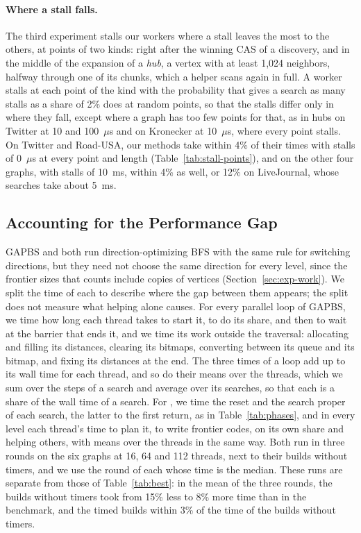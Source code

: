 \paragraph{Where a stall falls.} The third experiment stalls our workers where a stall leaves the most to the others, at points of two kinds: right after the winning CAS of a discovery, and in the middle of the expansion of a \emph{hub}, a vertex with at least 1,024 neighbors, halfway through one of its chunks, which a helper scans again in full. A worker stalls at each point of the kind with the probability that gives a search as many stalls as a share of 2\% does at random points, so that the stalls differ only in where they fall, except where a graph has too few points for that, as in hubs on Twitter at 10 and 100~$\mu$s and on Kronecker at 10~$\mu$s, where every point stalls. On Twitter and Road-USA, our methods take within 4\% of their times with stalls of 0~$\mu$s at every point and length (Table~\ref{tab:stall-points}), and on the other four graphs, with stalls of 10~ms, within 4\% as well, or 12\% on LiveJournal, whose searches take about 5~ms.

\subsection{Accounting for the Performance Gap}
\label{sec:exp-speedup}

GAPBS and \wfdo both run direction-optimizing BFS with the same rule for switching directions, but they need not choose the same direction for every level, since the frontier sizes that \wfdo counts include copies of vertices (Section~\ref{sec:exp-work}). We split the time of each to describe where the gap between them appears; the split does not measure what helping alone causes. For every parallel loop of GAPBS, we time how long each thread takes to start it, to do its share, and then to wait at the barrier that ends it, and we time its work outside the traversal: allocating and filling its distances, clearing its bitmaps, converting between its queue and its bitmap, and fixing its distances at the end. The three times of a loop add up to its wall time for each thread, and so do their means over the threads, which we sum over the steps of a search and average over its searches, so that each is a share of the wall time of a search. For \wfdo, we time the reset and the search proper of each search, the latter to the first return, as in Table~\ref{tab:phases}, and in every level each thread's time to plan it, to write frontier codes, on its own share and helping others, with means over the threads in the same way. Both run in three rounds on the six graphs at 16, 64 and 112 threads, next to their builds without timers, and we use the round of each whose time is the median. These runs are separate from those of Table~\ref{tab:best}: in the mean of the three rounds, the builds without timers took from 15\% less to 8\% more time than in the benchmark, and the timed builds within 3\% of the time of the builds without timers.

